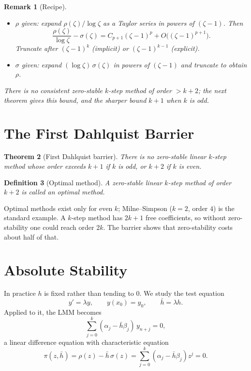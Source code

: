\documentclass[11pt,a4paper]{article}
\numberwithin{equation}{section}
\theoremstyle{spacedplain}
\newtheorem{theorem}{Theorem}[section]
\theoremstyle{spaceddefinition}
\newtheorem{definition}[theorem]{Definition}
\theoremstyle{spacedremark}
\newtheorem{remark}[theorem]{Remark}
\newcommand{\hb}{\bar h}
\begin{document}
\begin{remark}[Recipe]
\leavevmode
\begin{itemize}
  \item \emph{\(\rho\) given:} expand \(\rho(\zeta)/\log\zeta\) as a
    Taylor series in powers of \((\zeta-1)\).  Then
    \[
      \frac{\rho(\zeta)}{\log\zeta}-\sigma(\zeta)
      =C_{p+1}(\zeta-1)^p+O\bigl((\zeta-1)^{p+1}\bigr).
    \]
    Truncate after \((\zeta-1)^k\) (implicit) or \((\zeta-1)^{k-1}\)
    (explicit).
  \item \emph{\(\sigma\) given:} expand \((\log\zeta)\,\sigma(\zeta)\)
    in powers of \((\zeta-1)\) and truncate to obtain \(\rho\).
\end{itemize}
There is no consistent zero-stable \(k\)-step method of order
\(>k+2\); the next theorem gives this bound, and the sharper bound
\(k+1\) when \(k\) is odd.
\end{remark}

\section{The First Dahlquist Barrier}

\begin{keybox}
\begin{theorem}[First Dahlquist barrier]\label{thm:dahlquist}
There is no zero-stable linear \(k\)-step method whose order exceeds
\(k+1\) if \(k\) is odd, or \(k+2\) if \(k\) is even.
\end{theorem}
\end{keybox}

\begin{definition}[Optimal method]
A zero-stable linear \(k\)-step method of order \(k+2\) is called an
\emph{optimal method}.
\end{definition}

Optimal methods exist only for even \(k\); Milne--Simpson (\(k=2\),
order \(4\)) is the standard example.  A \(k\)-step method has
\(2k+1\) free coefficients, so without zero-stability one could reach
order \(2k\).  The barrier shows that zero-stability costs about half
of that.

\section{Absolute Stability}

In practice \(h\) is fixed rather than tending to \(0\).  We study the
test equation
\[
  y'=\lambda y,\qquad y(x_0)=y_0,\qquad \hb=\lambda h .
\]
Applied to it, the LMM becomes
\[
  \sum_{j=0}^k(\alpha_j-\hb\beta_j)\,y_{n+j}=0,
\]
a linear difference equation with characteristic equation
\[
  \pi(z,\hb)=\rho(z)-\hb\,\sigma(z)
  =\sum_{j=0}^k(\alpha_j-\hb\beta_j)z^j=0 .
\]
\end{document}
